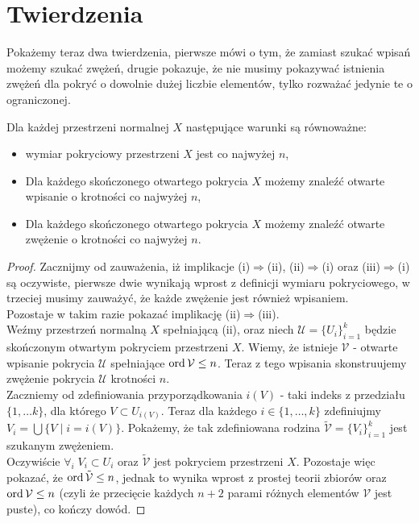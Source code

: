 \section{Twierdzenia}
Pokażemy teraz dwa twierdzenia, pierwsze mówi o tym, że zamiast szukać wpisań możemy szukać zwężeń, drugie pokazuje, że nie musimy pokazywać istnienia zwężeń dla pokryć o dowolnie dużej liczbie elementów, tylko rozważać jedynie te o ograniczonej.
\begin{twie} %
    Dla każdej przestrzeni normalnej $X$ następujące warunki są równoważne:
    \begin{itemize}
        \item[(i)] wymiar pokryciowy przestrzeni $X$ jest co najwyżej $n$,
        \item[(ii)] Dla każdego skończonego otwartego pokrycia $X$ możemy znaleźć otwarte wpisanie o krotności co najwyżej $n$,
        \item[(iii)] Dla każdego skończonego otwartego pokrycia $X$ możemy znaleźć otwarte zwężenie o krotności co najwyżej $n$.
    \end{itemize}
\end{twie}
\begin{proof}
    Zacznijmy od zauważenia, iż implikacje (i)$\Rightarrow$(ii), (ii)$\Rightarrow$(i) oraz (iii)$\Rightarrow$(i) są oczywiste, pierwsze dwie wynikają wprost z definicji wymiaru pokryciowego, w trzeciej musimy zauważyć, że każde zwężenie jest również wpisaniem. \\
    Pozostaje w takim razie pokazać implikację (ii)$\Rightarrow$(iii).\\
    Weźmy przestrzeń normalną $X$ spełniającą (ii), oraz niech $\mathcal{U}=\{U_i\}_{i=1}^k$ będzie skończonym otwartym pokryciem przestrzeni $X$. Wiemy, że istnieje $\mathcal{V}$ - otwarte wpisanie pokrycia $\mathcal{U}$ spełniające $\operatorname{ord} \mathcal{V}\leq n$. Teraz z tego wpisania skonstruujemy zwężenie pokrycia $\mathcal{U}$ krotności $n$.\\
    Zaczniemy od zdefiniowania przyporządkowania $i(V)$ - taki indeks z przedziału $\{1,\ldots k\}$, dla którego $V\subset U_{i(V)}$. Teraz dla każdego $i\in \{1, \ldots, k\}$ zdefiniujmy $V_i = \bigcup\{V\;|\;i=i(V)\}$. Pokażemy, że tak zdefiniowana rodzina $\tilde{\mathcal{V}}=\{V_i\}_{i=1}^k$ jest szukanym zwężeniem. \\
    Oczywiście $\forall_i\;V_i\subset U_i$ oraz $\tilde{\mathcal{V}}$ jest pokryciem przestrzeni $X$. Pozostaje więc pokazać, że $\operatorname{ord} \tilde{\mathcal{V}}\le n$, jednak to wynika wprost z prostej teorii zbiorów oraz $\operatorname{ord}\mathcal{V}\le n$ (czyli że przecięcie każdych $n+2$ parami różnych elementów $\mathcal{V}$ jest puste), co kończy dowód.
\end{proof}

